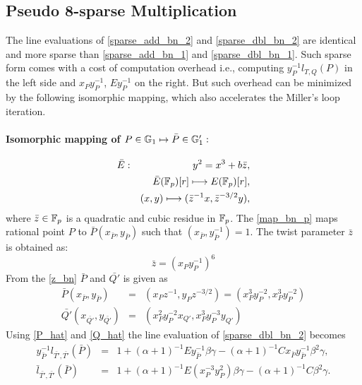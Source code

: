 \subsection{Pseudo 8-sparse Multiplication}
The line evaluations of \eqref{sparse_add_bn_2} and \eqref{sparse_dbl_bn_2} are identical and more sparse than \eqref{sparse_add_bn_1} and \eqref{sparse_dbl_bn_1}. Such sparse form comes with a cost of computation overhead i.e., computing $y_{P}^{-1}l_{T,Q}(P)$ in the left side and $x_Py_{P}^{-1}$, $Ey_P^{-1}$ on the right. But such overhead can be minimized by the following isomorphic mapping, which also accelerates the Miller's loop iteration.
\paragraph*{Isomorphic mapping of $P \in  {\mathbb{G}}_{1} \mapsto \bar{P} \in {\mathbb{G}}_{1}':$}
\begin{eqnarray}
	\bar{E}&:&y^2=x^3+b\bar{z},\nonumber\\
	&&\bar{E}(\mathbb{F}_p)[r]\longmapsto E(\mathbb{F}_p)[r],\nonumber\\
	&&(x,y)\longmapsto (\bar{z}^{-1}x,\bar{z}^{-3/2}y),\label{map_bn_p}
\end{eqnarray}
where $\bar{z} \in {\mathbb{F}}_{p}$ is a quadratic and cubic residue in ${\mathbb{F}}_{p}$.
The \eqref{map_bn_p} maps rational point $P$ to $\bar{P}(x_{\bar{P}},y_{\bar{P}})$ such that $(x_{\bar{P}},y_{\bar{P}}^{-1})=1$.
The twist parameter $\bar{z}$ is obtained as:
\begin{equation}\label{z_bn}
\bar{z}=(x_Py_P^{-1})^6
\end{equation}
From the \eqref{z_bn} $\bar{P}$ and $\bar{Q'}$ is given as
\begin{subequations}
\begin{eqnarray}
\bar{P}(x_{\bar{P}}, y_{\bar{P}})&=& (x_P z^{-1},y_P z^{-3/2}) =(x_P^3y_P^{-2},x_P^3y_P^{-2}) \label{P_hat} \\ 
\bar{Q'}(x_{\bar{Q'}}, y_{\bar{Q'}})&=&(x_P^2y_P^{-2}x_{Q'},x_P^3y_P^{-3}y_{Q'}) \label{Q_hat}
\end{eqnarray}
\end{subequations}
 Using \eqref{P_hat} and \eqref{Q_hat} the line evaluation of \eqref{sparse_dbl_bn_2} becomes 
 \begin{subequations}
\begin{eqnarray}
y_{\bar{P}}^{-1}l_{\bar{T'},\bar{T'}}(\bar{P})&=& 1+(\alpha+1)^{-1}Ey_{\bar{P}}^{-1}\beta\gamma-(\alpha+1)^{-1}Cx_{\bar{P}}y_{\bar{P}}^{-1}\beta^2 \gamma, \nonumber \\
\bar{l}_{\bar{T'},\bar{T'}}(\bar{P})&=& 1+(\alpha+1)^{-1}E(x_{P}^{-3} y_{P}^{2})\beta\gamma-(\alpha+1)^{-1}C\beta^2 \gamma. 
\label{psparse_dbl_bn_2} 
\end{eqnarray}
\end{subequations}
